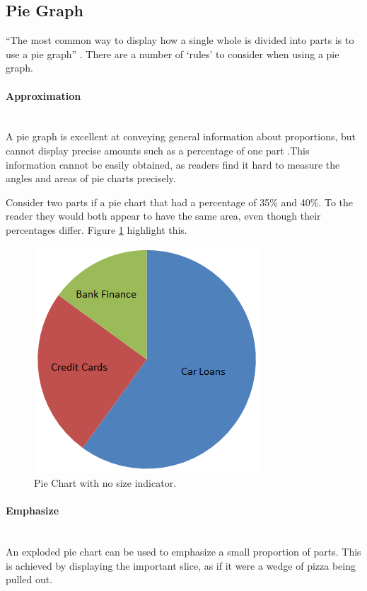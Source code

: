 \subsection{Pie Graph}
``The most common way to display how a single whole is divided into parts is to
use a pie graph'' \citep{kosslyn06}. There are a number of `rules' to consider 
when using a pie graph.

\paragraph{Approximation} ~\\
A pie graph is excellent at conveying general information about proportions, 
but cannot display precise amounts such as a percentage of one part 
\citep{kosslyn06}.This information cannot be easily obtained, as readers find 
it hard to measure the angles and areas of pie charts precisely. 

Consider two parts if a pie chart that had a percentage of 35\% and 40\%. To 
the reader they would both appear to have the same area, even though their 
percentages differ. Figure \ref{fig:pieapprox} highlight this.

\begin{figure}[H]
  \centering
    \includegraphics[scale=1]{chapter3/visualisation/pie_chart_approximate.png}
  \caption{Pie Chart with no size indicator.}
  \label{fig:pieapprox}
\end{figure}


\paragraph{Emphasize} ~\\
An exploded pie chart can be used to emphasize a small proportion of parts. 
This is achieved by displaying the important slice, as if it were a wedge of 
pizza being pulled out. 

